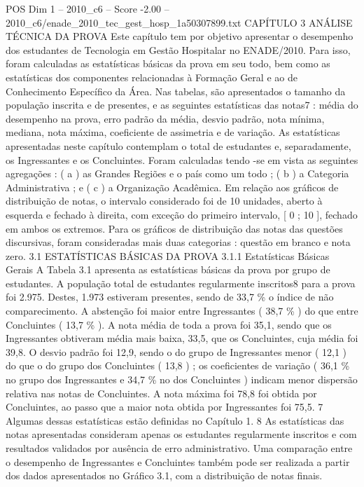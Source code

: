 \begin{textsample}{POS Dim 1 – 2010\_c6 – Score -2.00 – 2010\_c6/enade\_2010\_tec\_gest\_hosp\_1a50307899.txt}  \label{ex:f1_pos_170}
CAPÍTULO 3 ANÁLISE TÉCNICA DA PROVA Este capítulo tem por objetivo apresentar o desempenho dos estudantes de Tecnologia em Gestão Hospitalar no ENADE/2010.
Para isso, foram calculadas as estatísticas básicas da prova em seu todo, bem como as estatísticas dos componentes relacionadas à Formação Geral e ao de Conhecimento Específico da Área.
Nas tabelas, são apresentados o tamanho da população inscrita e de presentes, e as seguintes estatísticas das notas7 : média do desempenho na prova, erro padrão da média, desvio padrão, nota mínima, mediana, nota máxima, coeficiente de assimetria e de variação.
As estatísticas apresentadas neste capítulo contemplam o total de estudantes e, separadamente, os Ingressantes e os Concluintes.
Foram calculadas tendo -se em vista as seguintes agregações : ( a ) as Grandes Regiões e o país como um todo ; ( b ) a Categoria Administrativa ; e ( c ) a Organização Acadêmica.
Em relação aos gráficos de distribuição de notas, o intervalo considerado foi de 10 unidades, aberto à esquerda e fechado à direita, com exceção do primeiro intervalo, [ 0 ; 10 ], fechado em ambos os extremos.
Para os gráficos de distribuição das notas das questões discursivas, foram consideradas mais duas categorias : questão em branco e nota zero. 3.1 ESTATÍSTICAS BÁSICAS DA PROVA 3.1.1 Estatísticas Básicas Gerais A Tabela 3.1 apresenta as estatísticas básicas da prova por grupo de estudantes.
A população total de estudantes regularmente inscritos8 para a prova foi 2.975.
Destes, 1.973 estiveram presentes, sendo de 33,7 \% o índice de não comparecimento.
A abstenção foi maior entre Ingressantes ( 38,7 \% ) do que entre Concluintes ( 13,7 \% ).
A nota média de toda a prova foi 35,1, sendo que os Ingressantes obtiveram média mais baixa, 33,5, que os Concluintes, cuja média foi 39,8.
O desvio padrão foi 12,9, sendo o do grupo de Ingressantes menor ( 12,1 ) do que o do grupo dos Concluintes ( 13,8 ) ; os coeficientes de variação ( 36,1 \% no grupo dos Ingressantes e 34,7 \% no dos Concluintes ) indicam menor dispersão relativa nas notas de Concluintes.
A nota máxima foi 78,8 foi obtida por Concluintes, ao passo que a maior nota obtida por Ingressantes foi 75,5. 7 Algumas dessas estatísticas estão definidas no Capítulo 1. 8 As estatísticas das notas apresentadas consideram apenas os estudantes regularmente inscritos e com resultados validados por ausência de erro administrativo.
Uma comparação entre o desempenho de Ingressantes e Concluintes também pode ser realizada a partir dos dados apresentados no Gráfico 3.1, com a distribuição de notas finais.

\end{textsample}
